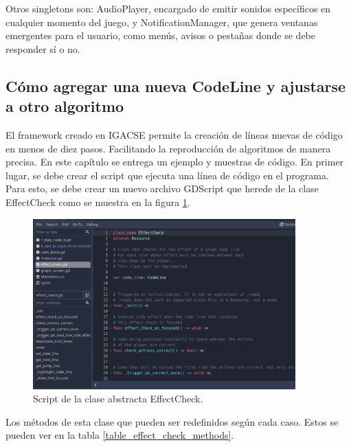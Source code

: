 Otros singletons son: AudioPlayer, encargado de emitir sonidos específicos en cualquier momento del juego, y NotificationManager, que genera ventanas emergentes para el usuario, como menús, avisos o pestañas donde se debe responder sí o no.

\subsection{Cómo agregar una nueva CodeLine y ajustarse a otro algoritmo}

El framework creado en IGACSE permite la creación de líneas nuevas de código en menos de diez pasos. Facilitando la reproducción de algoritmos de manera precisa. En este capítulo se entrega un ejemplo y muestras de código. En primer lugar, se debe crear el script que ejecuta una línea de código en el programa. Para esto, se debe crear un nuevo archivo GDScript que herede de la clase EffectCheck como se muestra en la figura \ref{effect_check_script}.

\begin{figure}[h!]
	\centering
	\includegraphics[width=0.9\textwidth]{imagenes/effect_check_script.png}
	\caption{Script de la clase abstracta EffectCheck.}
	\label{effect_check_script}
\end{figure}

Los métodos de esta clase que pueden ser redefinidos según cada caso. Estos se pueden ver en la tabla \ref{table_effect_check_methods}. 


